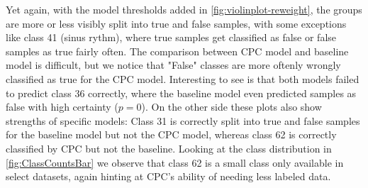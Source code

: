 Yet again, with the model thresholds added in \autoref{fig:violinplot-reweight}, the groups are more or less visibly split into true and false samples, with some exceptions like class 41 (sinus rythm), where true samples get classified as false or false samples as true fairly often. The comparison between CPC model and baseline model is difficult, but we notice that "False" classes are more oftenly wrongly classified as true for the CPC model. Interesting to see is that both models failed to predict class 36 correctly, where the baseline model even predicted samples as false with high certainty ($p=0$). On the other side these plots also show strengths of specific models: Class 31 is correctly split into true and false samples for the baseline model but not the CPC model, whereas class 62 is correctly classified by CPC but not the baseline. Looking at the class distribution in \autoref{fig:ClassCountsBar} we observe that class 62 is a small class only available in select datasets, again hinting at CPC's ability of needing less labeled data.


